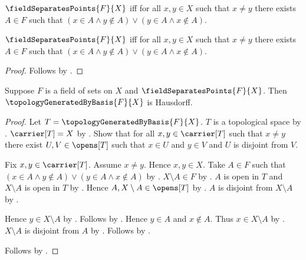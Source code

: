 \begin{definition}\label{field_separates_points}
    $\fieldSeparatesPoints{F}{X}$ iff
        for all $x,y\in X$ such that $x\neq y$ there exists $A\in F$
        such that $(x\in A\land y\notin A)\lor
            (y\in A\land x\notin A)$.
\end{definition}

\begin{proposition}\label{field_separates_points_iff}
    $\fieldSeparatesPoints{F}{X}$ iff
        for all $x,y\in X$ such that $x\neq y$ there exists $A\in F$
        such that $(x\in A\land y\notin A)\lor
            (y\in A\land x\notin A)$.
\end{proposition}
\begin{proof}
    Follows by .
\end{proof}

\begin{theorem}\label{point_separating_field_generated_topology_is_hausdorff}
    Suppose $F$ is a field of sets on $X$ and
        $\fieldSeparatesPoints{F}{X}$.
    Then $\topologyGeneratedByBasis{F}{X}$ is Hausdorff.
\end{theorem}
\begin{proof}
    Let $T=\topologyGeneratedByBasis{F}{X}$.
    $T$ is a topological space by
        .
    $\carrier[T]=X$ by
        .
    Show that for all $x,y\in\carrier[T]$ such that $x\neq y$
        there exist $U,V\in\opens[T]$ such that $x\in U$ and
            $y\in V$ and $U$ is disjoint from $V$.
    \begin{subproof}
        Fix $x,y\in\carrier[T]$.
        Assume $x\neq y$.
        Hence $x,y\in X$.
        Take $A\in F$ such that
            $(x\in A\land y\notin A)\lor
            (y\in A\land x\notin A)$ by
            .
        $X\setminus A\in F$ by .
        $A$ is open in $T$ and $X\setminus A$ is open in $T$ by
            .
        Hence $A,X\setminus A\in\opens[T]$ by .
        $A$ is disjoint from $X\setminus A$ by
            .
        \begin{byCase}
            Hence $y\in X\setminus A$ by .
            Follows by \auto.
            Hence $y\in A$ and $x\notin A$.
            Thus $x\in X\setminus A$ by .
            $X\setminus A$ is disjoint from $A$ by
                .
            Follows by \auto.
        \end{byCase}
    \end{subproof}
    Follows by .
\end{proof}

